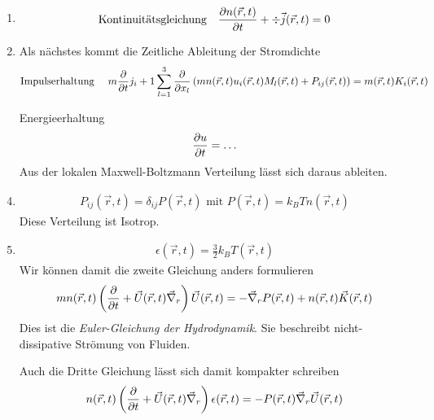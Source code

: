 \begin{enumerate}[1)]
  \item %
    \begin{align*}
      \text{Kontinuitätsgleichung} && \frac{\partial n(\vec{r}, t) }{\partial t} + \div \vec{j}(\vec{r}, t) = 0 \\
    \end{align*}
  \item Als nächstes kommt die Zeitliche Ableitung der Stromdichte
    \begin{align*}
      \text{Impulserhaltung } && m \frac{\partial  }{\partial t} j_i + 
      1\sum_{l=1}^{3} \frac{\partial  }{\partial x_l} \left( m n(\vec{r}, t) u_i(\vec{r}, t) M_l(\vec{r}, t)
      + P_{ij}(\vec{r}, t) \right) = m(\vec{r}, t) K_i(\vec{r}, t)
    \end{align*}
  \item[Energieerhaltung] 
    \begin{align*}
      \frac{\partial u }{\partial t} = \ldots
    \end{align*}
    Aus der lokalen Maxwell-Boltzmann Verteilung lässt sich daraus ableiten.
  \item %
    \begin{align*}
      P_{ij}(\vec{r}, t) = \delta_{ij} P(\vec{r}, t) \text{ mit } P(\vec{r}, t)
      = k_B T n(\vec{r}, t)
    \end{align*}
    Diese Verteilung ist Isotrop.
  \item
    \begin{align*}
      \epsilon(\vec{r}, t) = \frac{3}{2} k_B T(\vec{r}, t)
    \end{align*}
    Wir können damit die zweite Gleichung anders formulieren
    \begin{align*}
      m n(\vec{r}, t) \left( \frac{\partial  }{\partial t} + \vec{U} (\vec{r}, t) \vec{\nabla}_r \right)
      \vec{U} (\vec{r}, t) = - \vec{\nabla}_r P(\vec{r}, t) + n (\vec{r}, t)
      \vec{K}(\vec{r}, t)
    \end{align*}
    Dies ist die \emph{Euler-Gleichung der Hydrodynamik}. Sie beschreibt nicht-dissipative
    Strömung von Fluiden.

    Auch die Dritte Gleichung lässt sich damit kompakter schreiben
    \begin{align*}
      n(\vec{r}, t) \left( \frac{\partial  }{\partial t}  + \vec{U}(\vec{r}, t) \vec{\nabla}_r \right)
      \epsilon (\vec{r}, t) = - P(\vec{r}, t) \vec{\nabla}_r \vec{U}(\vec{r}, t)
    \end{align*}
    
  

\end{enumerate} 

